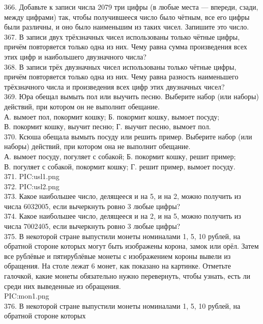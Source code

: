 366. Добавьте к записи числа 2079 три цифры (в любые места --- впереди, сзади, между цифрами) так, чтобы получившееся число было чётным, все его цифры были различны, и оно было наименьшим из таких чисел. Запишите это число.\\
367. В записи двух трёхзначных чисел использованы только чётные цифры, причём повторяется только одна из них. Чему равна сумма произведения всех этих цифр
и наибольшего двузначного числа?\\
368. В записи трёх двузначных чисел использованы только чётные цифры, причём повторяется только одна из них. Чему равна разность наименьшего
трёхзначного числа и произведения всех цифр этих двузначных чисел?\\
369. Юра обещал вымыть пол или выучить песню. Выберите набор (или наборы) действий, при котором он не выполнит обещание.\\
А. вымоет пол, покормит кошку;  \qquad \qquad Б. покормит кошку, вымоет посуду;\\
В. покормит кошку, выучит песню; \qquad \quad Г. выучит песню, вымоет пол.\\
370. Ксюша обещала вымыть посуду или решить пример. Выберите набор (или наборы) действий, при котором она не выполнит обещание.\\
А. вымоет посуду, погуляет с собакой;  \qquad \quad Б. покормит кошку, решит пример;\\
В. погуляет с собакой, покормит кошку; \qquad  Г. решит пример, вымоет посуду.\\
371. {{PIC:usl1.png}}\\
372. {{PIC:usl2.png}}\\
373. Какое наибольшее число, делящееся и на 5, и на 2, можно получить из числа 6032005, если
вычеркнуть ровно 3 любые цифры?\\
374. Какое наибольшее число, делящееся и на 2, и на 5, можно получить из числа 7002405, если
вычеркнуть ровно 3 любые цифры?\\
375. В некоторой стране выпустили монеты номиналами 1, 5, 10 рублей, на обратной стороне которых
могут быть изображены корона, замок или орёл. Затем все рублёвые и пятирублёвые монеты с
изображением короны вывели из обращения. На столе лежат 6 монет, как показано на картинке.
Отметьте галочкой, какие монеты обязательно нужно перевернуть, чтобы узнать, есть ли среди них
выведенные из обращения.\\
{{PIC:mon1.png}}\\
376. В некоторой стране выпустили монеты номиналами 1, 5, 10 рублей, на обратной стороне которых
